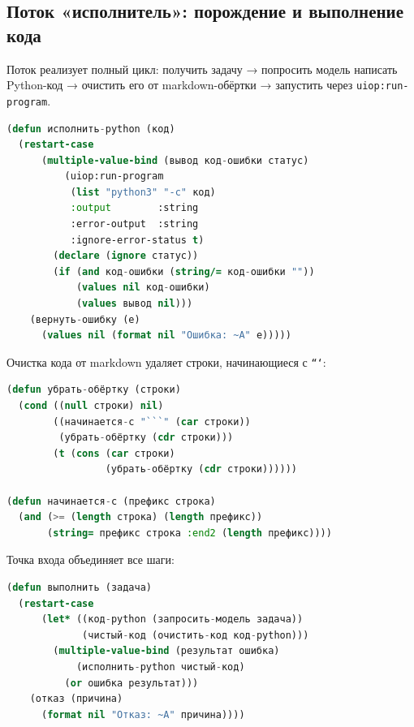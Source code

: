 \documentclass[11pt,a4paper]{article}
\begin{document}
\subsection{Поток «исполнитель»: порождение и выполнение кода}

Поток реализует полный цикл: получить задачу → попросить модель написать Python-код
→ очистить его от markdown-обёртки → запустить через \texttt{uiop:run-program}.

\begin{lstlisting}[language=CommonLisp, caption={Исполнение Python-кода через uiop}]
(defun исполнить-python (код)
  (restart-case
      (multiple-value-bind (вывод код-ошибки статус)
          (uiop:run-program
           (list "python3" "-c" код)
           :output        :string
           :error-output  :string
           :ignore-error-status t)
        (declare (ignore статус))
        (if (and код-ошибки (string/= код-ошибки ""))
            (values nil код-ошибки)
            (values вывод nil)))
    (вернуть-ошибку (e)
      (values nil (format nil "Ошибка: ~A" e)))))
\end{lstlisting}

Очистка кода от markdown удаляет строки, начинающиеся с \texttt{```}:

\begin{lstlisting}[language=CommonLisp, caption={Рекурсивная очистка markdown-обёртки}]
(defun убрать-обёртку (строки)
  (cond ((null строки) nil)
        ((начинается-с "```" (car строки))
         (убрать-обёртку (cdr строки)))
        (t (cons (car строки)
                 (убрать-обёртку (cdr строки))))))

(defun начинается-с (префикс строка)
  (and (>= (length строка) (length префикс))
       (string= префикс строка :end2 (length префикс))))
\end{lstlisting}

Точка входа объединяет все шаги:

\begin{lstlisting}[language=CommonLisp, caption={Точка входа потока исполнителя}]
(defun выполнить (задача)
  (restart-case
      (let* ((код-python (запросить-модель задача))
             (чистый-код (очистить-код код-python)))
        (multiple-value-bind (результат ошибка)
            (исполнить-python чистый-код)
          (or ошибка результат)))
    (отказ (причина)
      (format nil "Отказ: ~A" причина))))
\end{lstlisting}

\end{document}
